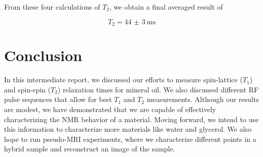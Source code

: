 \documentclass[
    floatfix,  %
    reprint,
    amsmath,amssymb,
    aps,
]{revtex4-2}
\begin{document}
From these four calculations of $T_2$, we obtain a final averaged result of

\begin{equation}
    T_2 = \SI[uncertainty-mode=separate]{44(3)}{\milli\second}
\end{equation}


\section{Conclusion}

In this intermediate report, we discussed our efforts to measure spin-lattice ($T_1$) and spin-spin ($T_2$) relaxation times for mineral oil. We also discussed different RF pulse sequences that allow for best $T_1$ and $T_2$ measurements. Although our results are modest, we have demonstrated that we are capable of effectively characterizing the NMR behavior of a material. Moving forward, we intend to use this information to characterize more materials like water and glycerol. We also hope to run pseudo-MRI experiments, where we characterize different points in a hybrid sample and reconstruct an image of the sample.






\nocite{*}


\end{document}
